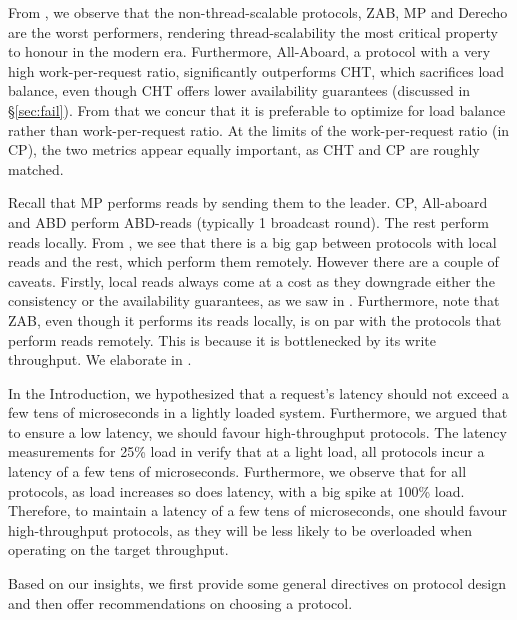 From , we observe that the non-thread-scalable protocols, ZAB, MP and Derecho are the worst performers, rendering thread-scalability the most critical property to honour in the modern era.
Furthermore, All-Aboard, a protocol with a very high work-per-request ratio, significantly outperforms CHT, which sacrifices load balance, even though CHT offers lower availability guarantees (discussed in \S\ref{sec:fail}).
From that we concur that it is preferable to optimize for load balance rather than work-per-request ratio. At the limits of the work-per-request ratio (\ie in CP), the two metrics appear equally important, as CHT and CP are roughly matched.




Recall that MP performs reads by sending them to the leader. CP, All-aboard and ABD perform ABD-reads (typically 1 broadcast round). The rest perform reads locally.
From , we see that there is a big gap between protocols with local reads and the rest, which perform them remotely. However there are a couple of caveats.
Firstly, local reads always come at a cost as they downgrade either the consistency or the availability guarantees, as we saw in .
Furthermore, note that ZAB, even though it performs its reads locally, is on par with the protocols that perform reads remotely.
This is because it is bottlenecked by its write throughput.
We elaborate in .


In the Introduction, we hypothesized that a request's latency should not exceed a few tens of microseconds in a lightly loaded system. 
Furthermore, we argued that to ensure a low latency, we should favour high-throughput protocols. %
The latency measurements for 25\% load in  verify that at a light load, all protocols incur a latency of a few tens of microseconds. 
Furthermore, we observe that for all protocols, as load increases so does latency, with a big spike at 100\% load. Therefore, to maintain a latency of a few tens of microseconds, 
one should favour high-throughput protocols, as they will be less likely to be overloaded when operating on the target throughput. %





Based on our insights, we first provide some general directives on protocol design and then offer recommendations on choosing a protocol.

